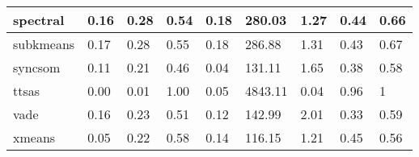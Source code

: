 \begin{table}[H]
\begin{tabular}{|l|l|l|l|l|l|l|l|l|}
\hline
spectral & 0.16 & 0.28 & 0.54 & 0.18 & 280.03 & 1.27 & 0.44 & 0.66 \\
\hline
subkmeans & 0.17 & 0.28 & 0.55 & 0.18 & 286.88 & 1.31 & 0.43 & 0.67 \\
\hline
syncsom & 0.11 & 0.21 & 0.46 & 0.04 & 131.11 & 1.65 & 0.38 & 0.58 \\
\hline
ttsas & 0.00 & 0.01 & 1.00 & 0.05 & 4843.11 & 0.04 & 0.96 & 1 \\
\hline
vade & 0.16 & 0.23 & 0.51 & 0.12 & 142.99 & 2.01 & 0.33 & 0.59 \\
\hline
xmeans & 0.05 & 0.22 & 0.58 & 0.14 & 116.15 & 1.21 & 0.45 & 0.56 \\
\hline
\end{tabular}
\end{table}